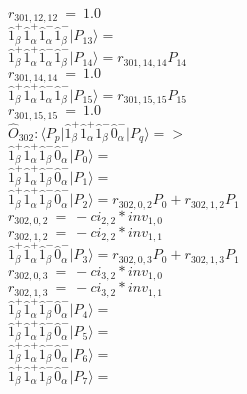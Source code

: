 \documentclass[14pt]{article}
\begin{document}
    ${r}_{301,12,12}\ =\ 1.0 $ \\ 
    $ \hat{1}_{\beta}^{+}\hat{1}_{\alpha}^{+}\hat{1}_{\alpha}^{-}\hat{1}_{\beta}^{-} \vert{P_{13}}\rangle =  $ \\ 
    $ \hat{1}_{\beta}^{+}\hat{1}_{\alpha}^{+}\hat{1}_{\alpha}^{-}\hat{1}_{\beta}^{-} \vert{P_{14}}\rangle = {r}_{301,14,14}P_{14} $ \\ 
    ${r}_{301,14,14}\ =\ 1.0 $ \\ 
    $ \hat{1}_{\beta}^{+}\hat{1}_{\alpha}^{+}\hat{1}_{\alpha}^{-}\hat{1}_{\beta}^{-} \vert{P_{15}}\rangle = {r}_{301,15,15}P_{15} $ \\ 
    ${r}_{301,15,15}\ =\ 1.0 $ \\ 
    
    $\hat{O}_{302}:  \langle{P_p}\vert \hat{1}_{\beta}^{+}\hat{1}_{\alpha}^{+}\hat{1}_{\beta}^{-}\hat{0}_{\alpha}^{-} \vert{P_q}\rangle => $ \\ 
    $ \hat{1}_{\beta}^{+}\hat{1}_{\alpha}^{+}\hat{1}_{\beta}^{-}\hat{0}_{\alpha}^{-} \vert{P_{0}}\rangle =  $ \\ 
    $ \hat{1}_{\beta}^{+}\hat{1}_{\alpha}^{+}\hat{1}_{\beta}^{-}\hat{0}_{\alpha}^{-} \vert{P_{1}}\rangle =  $ \\ 
    $ \hat{1}_{\beta}^{+}\hat{1}_{\alpha}^{+}\hat{1}_{\beta}^{-}\hat{0}_{\alpha}^{-} \vert{P_{2}}\rangle = {r}_{302,0,2}P_{0}+{r}_{302,1,2}P_{1} $ \\ 
    ${r}_{302,0,2}\ =\ -{ci}_{2,2}*{inv}_{1,0} $ \\ 
    ${r}_{302,1,2}\ =\ -{ci}_{2,2}*{inv}_{1,1} $ \\ 
    $ \hat{1}_{\beta}^{+}\hat{1}_{\alpha}^{+}\hat{1}_{\beta}^{-}\hat{0}_{\alpha}^{-} \vert{P_{3}}\rangle = {r}_{302,0,3}P_{0}+{r}_{302,1,3}P_{1} $ \\ 
    ${r}_{302,0,3}\ =\ -{ci}_{3,2}*{inv}_{1,0} $ \\ 
    ${r}_{302,1,3}\ =\ -{ci}_{3,2}*{inv}_{1,1} $ \\ 
    $ \hat{1}_{\beta}^{+}\hat{1}_{\alpha}^{+}\hat{1}_{\beta}^{-}\hat{0}_{\alpha}^{-} \vert{P_{4}}\rangle =  $ \\ 
    $ \hat{1}_{\beta}^{+}\hat{1}_{\alpha}^{+}\hat{1}_{\beta}^{-}\hat{0}_{\alpha}^{-} \vert{P_{5}}\rangle =  $ \\ 
    $ \hat{1}_{\beta}^{+}\hat{1}_{\alpha}^{+}\hat{1}_{\beta}^{-}\hat{0}_{\alpha}^{-} \vert{P_{6}}\rangle =  $ \\ 
    $ \hat{1}_{\beta}^{+}\hat{1}_{\alpha}^{+}\hat{1}_{\beta}^{-}\hat{0}_{\alpha}^{-} \vert{P_{7}}\rangle =  $ \\ 
\end{document}

